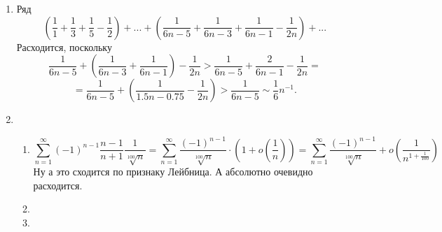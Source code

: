 \documentclass[11pt]{article}
\begin{document}
\begin{enumerate}
		\item Ряд $$\left(\frac1{1}+\frac1{3}+\frac1{5}-\frac1{2}\right)+...+\left(\frac1{{6n-5}}+\frac1{{6n-3}}+\frac1{{6n-1}}-\frac1{{2n}}\right)+...$$ Расходится, поскольку $$ \frac1{{6n-5}}+\left(\frac1{{6n-3}}+\frac1{{6n-1}}\right)-\frac1{{2n}}>\frac1{{6n-5}}+\frac2{{6n-1}}-\frac1{{2n}}=$$
		$$=\frac1{{6n-5}}+\left(\frac1{{1.5n-0.75}}-\frac1{{2n}}\right)>\frac1{{6n-5}}\sim\frac1{6}n^{-1}. $$
		
		\item \begin{enumerate}
			\item $$\sum_{n=1}^{\infty} (-1)^{n-1} \frac{n-1}{n+1} \frac{1}{\sqrt[100]{n}} = \sum_{n=1}^{\infty} \frac{(-1)^{n-1}}{\sqrt[100]{n}} \cdot \left( 1+o\left(\frac{1}{n}\right)\right) = \sum_{n=1}^{\infty} \frac{(-1)^{n-1}}{\sqrt[100]{n}} +o\left(\frac{1}{n^{1+\frac{1}{100}}}\right)$$
			Ну а это сходится по признаку Лейбница. А абсолютно очевидно расходится.
			
			\item 
			
			\item
			
		\end{enumerate}
		
	\end{enumerate}
\end{document}
